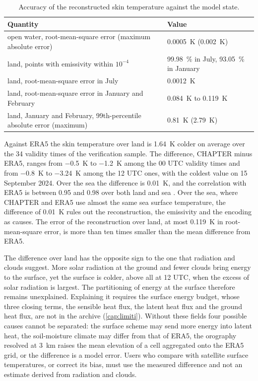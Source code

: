 \begin{table}[htbp]
  \centering
  \small
  \caption{Accuracy of the reconstructed skin temperature against the model state.}
  \label{tab:skt}
  \begin{tabularx}{\textwidth}{@{}Xl@{}}
    \toprule
    Quantity & Value \\
    \midrule
    open water, root-mean-square error (maximum absolute error) & \SI{0.0005}{K} (\SI{0.002}{K}) \\
    land, points with emissivity within $10^{-4}$ & \SI{99.98}{\percent} in July, \SI{93.05}{\percent} in January \\
    land, root-mean-square error in July & \SI{0.0012}{K} \\
    land, root-mean-square error in January and February & \SI{0.084}{K} to \SI{0.119}{K} \\
    land, January and February, 99th-percentile absolute error (maximum) & \SI{0.81}{K} (\SI{2.79}{K}) \\
    \bottomrule
  \end{tabularx}
\end{table}

Against ERA5 the skin temperature over land is \SI{1.64}{K} colder on average over the 34 validity
times of the verification sample. The difference, CHAPTER minus ERA5, ranges from \SI{-0.5}{K} to
\SI{-1.2}{K} among the 00 UTC validity times and from \SI{-0.8}{K} to \SI{-3.24}{K} among the
12 UTC ones, with the coldest value on 15 September 2024. Over the sea the difference is
\SI{+0.01}{K}, and the correlation with ERA5 is between \num{0.95} and \num{0.98} over both land and
sea \parencite{issue57}. Over the sea, where CHAPTER and ERA5 use almost the same sea surface temperature,
the difference of \SI{0.01}{K} rules out the reconstruction, the emissivity and the encoding as
causes. The error of the reconstruction over land, at most \SI{0.119}{K} in root-mean-square error,
is more than ten times smaller than the mean difference from ERA5.

The difference over land has the opposite sign to the one that radiation and clouds suggest.
More solar radiation at the ground and fewer clouds bring energy to the surface, yet the surface is
colder, above all at 12 UTC, when the excess of solar radiation is largest. The partitioning of
energy at the surface therefore remains unexplained. Explaining it requires the surface energy
budget, whose three closing terms, the sensible heat flux, the latent heat flux and the ground heat
flux, are not in the archive (\cref{cap:limiti}). Without these fields four possible causes cannot
be separated: the surface scheme may send more energy into latent heat, the soil-moisture climate
may differ from that of ERA5, the orography resolved at \SI{3}{km} raises the mean elevation of a
cell aggregated onto the ERA5 grid, or the difference is a model error. Users who compare
 with satellite surface temperatures, or correct its bias, must use the measured
difference and not an estimate derived from radiation and clouds.

